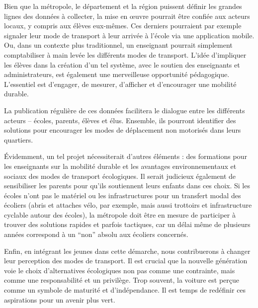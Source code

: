 Bien que la métropole, le département et la région puissent définir
les grandes lignes des données à collecter, la mise en œuvre pourrait
être confiée aux acteurs locaux, y compris aux élèves eux-mêmes. Ces
derniers pourraient par exemple signaler leur mode de transport à leur
arrivée à l'école via une application mobile. Ou, dans un contexte
plus traditionnel, un enseignant pourrait simplement comptabiliser à
main levée les différents modes de transport. L'idée d'impliquer les
élèves dans la création d'un tel système, avec le soutien des
enseignants et administrateurs, est également une merveilleuse
opportunité pédagogique. L'essentiel est d'engager, de mesurer,
d'afficher et d'encourager une mobilité durable.

La publication régulière de ces données facilitera le dialogue entre
les différents acteurs – écoles, parents, élèves et élus. Ensemble,
ils pourront identifier des solutions pour encourager les modes de
déplacement non motorisés dans leurs quartiers.

Évidemment, un tel projet nécessiterait d'autres éléments : des
formations pour les enseignants sur la mobilité durable et les
avantages environnementaux et sociaux des modes de transport
écologiques.  Il serait judicieux également de sensibiliser les
parents pour qu'ils soutiennent leurs enfants dans ces choix.  Si les
écoles n'ont pas le matériel ou les infrastructures pour un transfert
modal des écoliers (abris et attaches vélo, par exemple, mais aussi
trottoirs et infrastructure cyclable autour des écoles), la métropole
doit être en mesure de participer à trouver des solutions rapides et
parfois tactiques, car un délai même de plusieurs années correspond à
un ``non'' absolu aux écoliers concernés.

Enfin, en intégrant les jeunes dans cette démarche, nous contribuerons
à changer leur perception des modes de transport. Il est crucial que
la nouvelle génération voie le choix d'alternatives écologiques non
pas comme une contrainte, mais comme une responsabilité et un
privilège. Trop souvent, la voiture est perçue comme un symbole de
maturité et d'indépendance. Il est temps de redéfinir ces aspirations
pour un avenir plus vert.
